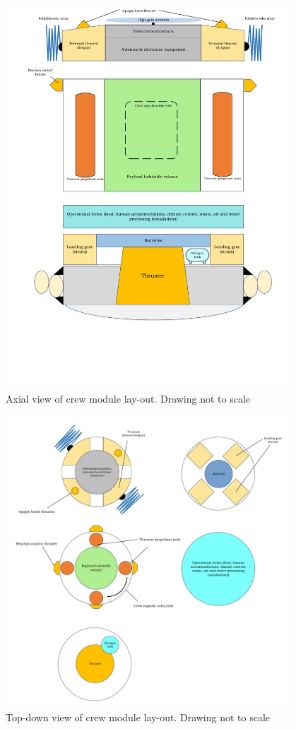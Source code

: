 \begin{figure}[h]
		\centering
		\includegraphics[width=0.95\textwidth]{./Figure/CrewModule/Axialview.pdf}
		\caption[Axial view of crew module lay-out]{Axial view of crew module lay-out. Drawing not to scale}
		\label{fig:axview}
\end{figure}

\begin{figure}[h]
		\centering
		\includegraphics[width=0.95\textwidth]{./Figure/CrewModule/TopviewV2.pdf}
		\caption[Top-down view of crew module lay-out]{Top-down view of crew module lay-out. Drawing not to scale}
		\label{fig:topview}
\end{figure}


